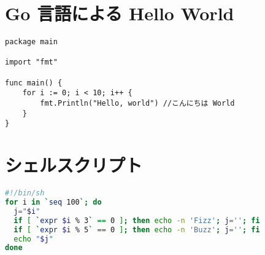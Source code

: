 \documentclass{jlreq}
\begin{document}
\section{Go 言語による Hello World}

\begin{lstlisting}[language=Golang]
package main

import "fmt"

func main() {
    for i := 0; i < 10; i++ {
        fmt.Println("Hello, world") //こんにちは World
    }
}
\end{lstlisting}

\section{シェルスクリプト}

\begin{lstlisting}[language=sh]
#!/bin/sh
for i in `seq 100`; do
  j="$i"
  if [ `expr $i % 3` == 0 ]; then echo -n 'Fizz'; j=''; fi
  if [ `expr $i % 5` == 0 ]; then echo -n 'Buzz'; j=''; fi
  echo "$j"
done
\end{lstlisting}
\end{document}
